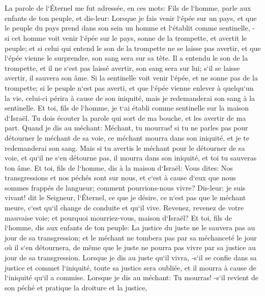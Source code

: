 \chapter{}

\verse La parole de l`Éternel me fut adressée, en ces mots: 
\verse Fils de l`homme, parle aux enfants de ton peuple, et dis-leur: Lorsque je fais venir l`épée sur un pays, et que le peuple du pays prend dans son sein un homme et l`établit comme sentinelle, - 
\verse si cet homme voit venir l`épée sur le pays, sonne de la trompette, et avertit le peuple; 
\verse et si celui qui entend le son de la trompette ne se laisse pas avertir, et que l`épée vienne le surprendre, son sang sera sur sa tête. 
\verse Il a entendu le son de la trompette, et il ne s`est pas laissé avertir, son sang sera sur lui; s`il se laisse avertir, il sauvera son âme. 
\verse Si la sentinelle voit venir l`épée, et ne sonne pas de la trompette; si le peuple n`est pas averti, et que l`épée vienne enlever à quelqu`un la vie, celui-ci périra à cause de son iniquité, mais je redemanderai son sang à la sentinelle. 
\verse Et toi, fils de l`homme, je t`ai établi comme sentinelle sur la maison d`Israël. Tu dois écouter la parole qui sort de ma bouche, et les avertir de ma part. 
\verse Quand je dis au méchant: Méchant, tu mourras! si tu ne parles pas pour détourner le méchant de sa voie, ce méchant mourra dans son iniquité, et je te redemanderai son sang. 
\verse Mais si tu avertis le méchant pour le détourner de sa voie, et qu`il ne s`en détourne pas, il mourra dans son iniquité, et toi tu sauveras ton âme. 
\verse Et toi, fils de l`homme, dis à la maison d`Israël: Vous dites: Nos transgressions et nos péchés sont sur nous, et c`est à cause d`eux que nous sommes frappés de langueur; comment pourrions-nous vivre? 
\verse Dis-leur: je suis vivant! dit le Seigneur, l`Éternel, ce que je désire, ce n`est pas que le méchant meure, c`est qu`il change de conduite et qu`il vive. Revenez, revenez de votre mauvaise voie; et pourquoi mourriez-vous, maison d`Israël? 
\verse Et toi, fils de l`homme, dis aux enfants de ton peuple: La justice du juste ne le sauvera pas au jour de sa transgression; et le méchant ne tombera pas par sa méchanceté le jour où il s`en détournera, de même que le juste ne pourra pas vivre par sa justice au jour de sa transgression. 
\verse Lorsque je dis au juste qu`il vivra, -s`il se confie dans sa justice et commet l`iniquité, toute sa justice sera oubliée, et il mourra à cause de l`iniquité qu`il a commise. 
\verse Lorsque je dis au méchant: Tu mourras! -s`il revient de son péché et pratique la droiture et la justice, 

